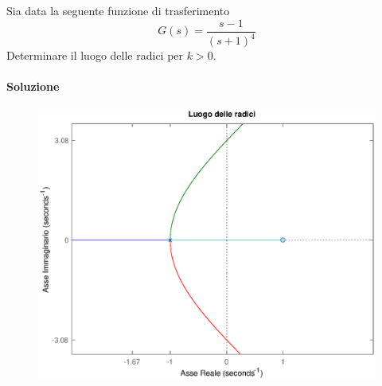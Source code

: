 \exercise{}
Sia data la seguente funzione di trasferimento
\[
	G(s) = \frac{s-1}{(s+1)^4}
\]
Determinare il luogo delle radici per \(k>0\).

\paragraph{Soluzione}

\begin{figure}[ht]
	\centering
	\includegraphics[scale=.6]{mod1/assets/rl_ex314}
\end{figure}

